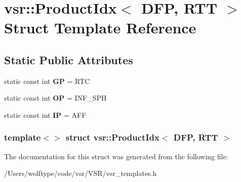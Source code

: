 \hypertarget{structvsr_1_1_product_idx_3_01_d_f_p_00_01_r_t_t_01_4}{\section{vsr\-:\-:Product\-Idx$<$ D\-F\-P, R\-T\-T $>$ Struct Template Reference}
\label{structvsr_1_1_product_idx_3_01_d_f_p_00_01_r_t_t_01_4}
}
\subsection*{Static Public Attributes}
\begin{DoxyCompactItemize}
\item 
\hypertarget{structvsr_1_1_product_idx_3_01_d_f_p_00_01_r_t_t_01_4_a62d9978fe057878a1b0eb8d8d2e4e01c}{static const int {\bfseries G\-P} = R\-T\-C}\label{structvsr_1_1_product_idx_3_01_d_f_p_00_01_r_t_t_01_4_a62d9978fe057878a1b0eb8d8d2e4e01c}

\item 
\hypertarget{structvsr_1_1_product_idx_3_01_d_f_p_00_01_r_t_t_01_4_a2ff58703644f1d112c0747f11a97e6cb}{static const int {\bfseries O\-P} = I\-N\-F\-\_\-\-S\-P\-H}\label{structvsr_1_1_product_idx_3_01_d_f_p_00_01_r_t_t_01_4_a2ff58703644f1d112c0747f11a97e6cb}

\item 
\hypertarget{structvsr_1_1_product_idx_3_01_d_f_p_00_01_r_t_t_01_4_ad1a5b7049a86811c5e2a33a13c14f21a}{static const int {\bfseries I\-P} = A\-F\-F}\label{structvsr_1_1_product_idx_3_01_d_f_p_00_01_r_t_t_01_4_ad1a5b7049a86811c5e2a33a13c14f21a}

\end{DoxyCompactItemize}
\subsubsection*{template$<$$>$ struct vsr\-::\-Product\-Idx$<$ D\-F\-P, R\-T\-T $>$}



The documentation for this struct was generated from the following file\-:\begin{DoxyCompactItemize}
\item 
/\-Users/wolftype/code/vsr/\-V\-S\-R/vsr\-\_\-templates.\-h\end{DoxyCompactItemize}
